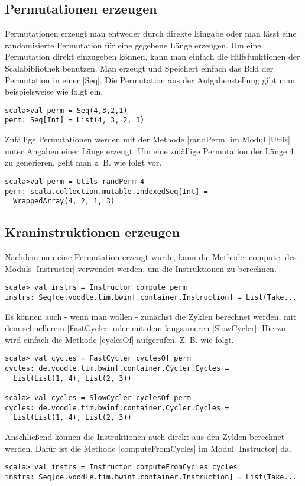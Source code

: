 \subsection{Permutationen erzeugen}
Permutationen erzeugt man entweder durch direkte Eingabe oder man lässt eine randomisierte Permutation für eine gegebene Länge erzeugen.
Um eine Permutation direkt einzugeben können, kann man einfach die Hilfsfunktionen der Scalabibliothek benutzen.
Man erzeugt und Speichert einfach das Bild der Permutation in einer |Seq|. Die Permutation aus der Aufgabenstellung gibt man beispielsweise wie folgt ein.
\begin{lstlisting}
scala>val perm = Seq(4,3,2,1)
perm: Seq[Int] = List(4, 3, 2, 1)  
\end{lstlisting}
Zufällige Permutationen werden mit der Methode |randPerm| im Modul |Utils| unter Angaben einer Länge erzeugt.
Um eine zufällige Permutation der Länge 4 zu generieren, geht man z. B. wie folgt vor.
\begin{lstlisting}
scala>val perm = Utils randPerm 4                                                                                                 
perm: scala.collection.mutable.IndexedSeq[Int] =
  WrappedArray(4, 2, 1, 3)  
\end{lstlisting}
\subsection{Kraninstruktionen erzeugen}
Nachdem nun eine Permutation erzeugt wurde, kann die Methode |compute| des Moduls |Instructor| verwendet werden, um die Instruktionen zu berechnen.
\begin{lstlisting}
scala> val instrs = Instructor compute perm
instrs: Seq[de.voodle.tim.bwinf.container.Instruction] = List(Take...
\end{lstlisting}
Es können auch - wenn man wollen - zunächst die Zyklen berechnet werden, mit dem schnellerem |FastCycler| oder mit dem langsameren |SlowCycler|.
Hierzu wird einfach die Methode |cyclesOf| aufgerufen. Z. B. wie folgt.
\begin{lstlisting}
scala> val cycles = FastCycler cyclesOf perm
cycles: de.voodle.tim.bwinf.container.Cycler.Cycles =
  List(List(1, 4), List(2, 3))

scala> val cycles = SlowCycler cyclesOf perm
cycles: de.voodle.tim.bwinf.container.Cycler.Cycles =
  List(List(1, 4), List(2, 3))
\end{lstlisting}
Anschließend können die Instruktionen auch direkt aus den Zyklen berechnet werden. Dafür ist die Methode |computeFromCycles| im Modul |Instructor| da.
\begin{lstlisting}
scala> val instrs = Instructor computeFromCycles cycles
instrs: Seq[de.voodle.tim.bwinf.container.Instruction] = List(Take...
\end{lstlisting}
